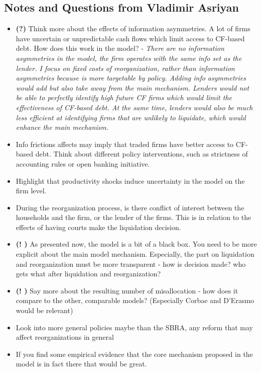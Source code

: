 \documentclass[12pt]{article}
\begin{document}
\subsection*{Notes and Questions from Vladimir Asriyan}
\begin{itemize} \setlength\itemsep{0em}  \small
    \item \textbf{(?)} Think more about the effects of information asymmetries. A lot of firms have uncertain or unpredictable cash flows which limit access to CF-based debt. How does this work in the model? - \textit{There are no information asymmetries in the model, the firm operates with the same info set as the lender. I focus on fixed costs of reorganization, rather than information asymmetries because is more targetable by policy. Adding info asymmetries would add but also take away from the main mechanism. Lenders would not be able to perfectly identify high future CF firms which would limit the effectiveness of CF-based debt. At the same time, lenders would also be much less efficient at identifying firms that are unlikely to liquidate, which would enhance the main mechanism.}
    \item Info frictions affects may imply that traded firms have better access to CF-based debt. Think about different policy interventions, such as strictness of accounting rules or open banking initiative.
    \item Highlight that productivity shocks induce uncertainty in the model on the firm level.
    \item During the reorganization process, is there  conflict of interest between the households and the firm, or the lender of the firms. This is in relation to the effects of having courts make the liquidation decision.
    \item \textbf{(! \checkmark)} As presented now, the model is a bit of a black box. You need to be more explicit about the main model mechanism. Especially, the part on liquidation and reorganization must be more transparent - how is decision made? who gets what after liquidation and reorganization?
    \item \textbf{(! \checkmark)} Say more about the resulting number of misallocation - how does it compare to the other, comparable models? (Especially Corbae and D'Erasmo would be relevant)
    \item Look into more general policies maybe than the SBRA, any reform that may affect reorganizations in general
    \item If you find some empirical evidence that the core mechanism proposed in the model is in fact there that would be great.
\end{itemize} \normalsize
\end{document}
